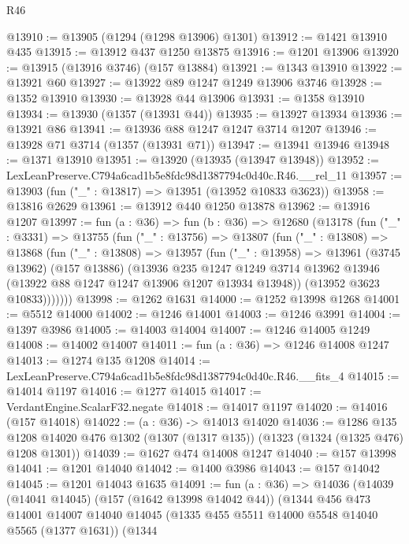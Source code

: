\begin{lexlean}{R46}
\begin{coremodule}
@13910 := @13905 (@1294 (@1298 @13906) @1301)
@13912 := @1421 @13910 @435
@13915 := @13912 @437 @1250 @13875
@13916 := @1201 @13906
@13920 := @13915 (@13916 @3746) (@157 @13884)
@13921 := @1343 @13910
@13922 := @13921 @60
@13927 := @13922 @89 @1247 @1249 @13906 @3746
@13928 := @1352 @13910
@13930 := @13928 @44 @13906
@13931 := @1358 @13910
@13934 := @13930 (@1357 (@13931 @44))
@13935 := @13927 @13934
@13936 := @13921 @86
@13941 := @13936 @88 @1247 @1247 @3714 @1207
@13946 := @13928 @71 @3714 (@1357 (@13931 @71))
@13947 := @13941 @13946
@13948 := @1371 @13910
@13951 := @13920 (@13935 (@13947 @13948))
@13952 := LexLeanPreserve.C794a6cad1b5e8fdc98d1387794c0d40c.R46.__rel_11
@13957 := @13903 (fun ("_" : @13817) => @13951 (@13952 @10833 @3623))
@13958 := @13816 @2629
@13961 := @13912 @440 @1250 @13878
@13962 := @13916 @1207
@13997 := fun (a : @36) =>
  fun (b : @36) =>
  @12680
    (@13178
      (fun ("_" : @3331) =>
      @13755
        (fun ("_" : @13756) =>
        @13807
          (fun ("_" : @13808) =>
          @13868
            (fun ("_" : @13808) =>
            @13957
              (fun ("_" : @13958) =>
              @13961
                (@3745 @13962)
                (@157 @13886)
                (@13936
                  @235
                  @1247
                  @1249
                  @3714
                  @13962
                  @13946
                  (@13922 @88 @1247 @1247 @13906 @1207 @13934 @13948))
                (@13952 @3623 @10833)))))))
@13998 := @1262 @1631
@14000 := @1252 @13998 @1268
@14001 := @5512 @14000
@14002 := @1246 @14001
@14003 := @1246 @3991
@14004 := @1397 @3986
@14005 := @14003 @14004
@14007 := @1246 @14005 @1249
@14008 := @14002 @14007
@14011 := fun (a : @36) => @1246 @14008 @1247
@14013 := @1274 @135 @1208
@14014 := LexLeanPreserve.C794a6cad1b5e8fdc98d1387794c0d40c.R46.__fits_4
@14015 := @14014 @1197
@14016 := @1277 @14015
@14017 := VerdantEngine.ScalarF32.negate
@14018 := @14017 @1197
@14020 := @14016 (@157 @14018)
@14022 := (a : @36) -> @14013 @14020
@14036 := @1286
    @135
    @1208
    @14020
    @476
    @1302
    (@1307 (@1317 @135))
    (@1323 (@1324 (@1325 @476) @1208 @1301))
@14039 := @1627 @474 @14008 @1247
@14040 := @157 @13998
@14041 := @1201 @14040
@14042 := @1400 @3986
@14043 := @157 @14042
@14045 := @1201 @14043 @1635
@14091 := fun (a : @36) =>
  @14036
    (@14039
      (@14041 @14045)
      (@157 (@1642 @13998 @14042 @44))
      (@1344
        @456
        @473
        @14001
        @14007
        @14040
        @14045
        (@1335 @455 @5511 @14000 @5548 @14040 @5565 (@1377 @1631))
        (@1344

\end{coremodule}
\end{lexlean}
